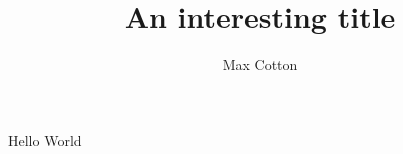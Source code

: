 \documentclass[10pt,a4paper]{article}
\title{An interesting title}
\author{Max Cotton}
\date{}
\begin{document}
\maketitle

\section{}

Hello World
\end{document}
